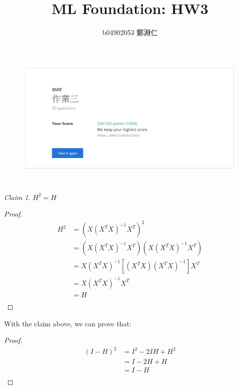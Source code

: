 \documentclass[12pt,a4paper]{article}
\title{ML Foundation: HW3}
\author{b04902053 鄭淵仁}
\theoremstyle{remark}
\newtheorem{claim}{Claim}
\begin{document}
\maketitle
\section{} %
\begin{figure}[h!]
	\centering
	\includegraphics[width=\linewidth]{code/q1.png}
\end{figure}
\section{} %
\begin{claim}
	${H}^{2} = H$
	\begin{proof}
		\[
			\begin{aligned}
				{H}^{2} &= {(X {({X}^{T}X)}^{-1} {X}^{T})} ^ {2} \\
						&= (X {({X}^{T}X)}^{-1} {X}^{T}) (X {({X}^{T}X)}^{-1} {X}^{T}) \\
						&= X {({X}^{T}X)}^{-1} [ ({X}^{T} X) {({X}^{T}X)}^{-1} ] {X}^{T} \\
						&= X {({X}^{T}X)}^{-1} {X}^{T} \\
						&= H \\
			\end{aligned}
		\]
	\end{proof}
\end{claim}
With the claim above, we can prove that:
\begin{proof}
	\[
		\begin{aligned}
			{(I-H)}^{2} &= {I}^{2} - 2IH + {H}^{2} \\
						&= I - 2H + H \\
						&= I - H \\
		\end{aligned}
	\]
\end{proof}
\end{document}
